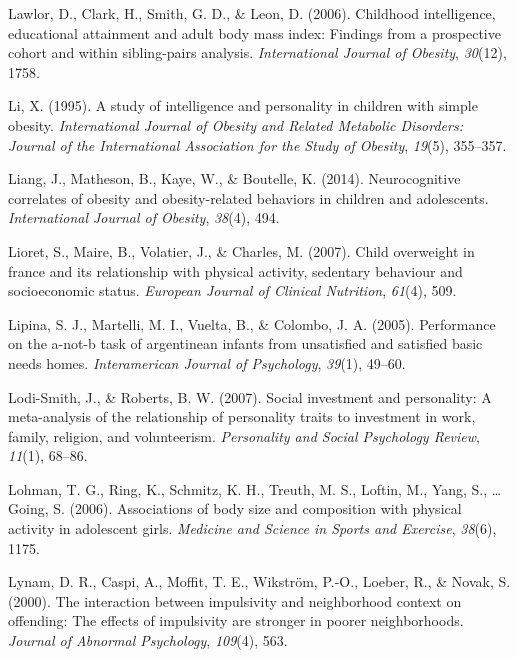 \documentclass[man]{apa6}
\begin{document}
\leavevmode\hypertarget{ref-lawlor2006childhood}{}%
Lawlor, D., Clark, H., Smith, G. D., \& Leon, D. (2006). Childhood intelligence, educational attainment and adult body mass index: Findings from a prospective cohort and within sibling-pairs analysis. \emph{International Journal of Obesity}, \emph{30}(12), 1758.

\leavevmode\hypertarget{ref-li1995study}{}%
Li, X. (1995). A study of intelligence and personality in children with simple obesity. \emph{International Journal of Obesity and Related Metabolic Disorders: Journal of the International Association for the Study of Obesity}, \emph{19}(5), 355--357.

\leavevmode\hypertarget{ref-liang2014neurocognitive}{}%
Liang, J., Matheson, B., Kaye, W., \& Boutelle, K. (2014). Neurocognitive correlates of obesity and obesity-related behaviors in children and adolescents. \emph{International Journal of Obesity}, \emph{38}(4), 494.

\leavevmode\hypertarget{ref-lioret2007child}{}%
Lioret, S., Maire, B., Volatier, J., \& Charles, M. (2007). Child overweight in france and its relationship with physical activity, sedentary behaviour and socioeconomic status. \emph{European Journal of Clinical Nutrition}, \emph{61}(4), 509.

\leavevmode\hypertarget{ref-lipina2005performance}{}%
Lipina, S. J., Martelli, M. I., Vuelta, B., \& Colombo, J. A. (2005). Performance on the a-not-b task of argentinean infants from unsatisfied and satisfied basic needs homes. \emph{Interamerican Journal of Psychology}, \emph{39}(1), 49--60.

\leavevmode\hypertarget{ref-lodi2007social}{}%
Lodi-Smith, J., \& Roberts, B. W. (2007). Social investment and personality: A meta-analysis of the relationship of personality traits to investment in work, family, religion, and volunteerism. \emph{Personality and Social Psychology Review}, \emph{11}(1), 68--86.

\leavevmode\hypertarget{ref-lohman2006associations}{}%
Lohman, T. G., Ring, K., Schmitz, K. H., Treuth, M. S., Loftin, M., Yang, S., \ldots{} Going, S. (2006). Associations of body size and composition with physical activity in adolescent girls. \emph{Medicine and Science in Sports and Exercise}, \emph{38}(6), 1175.

\leavevmode\hypertarget{ref-lynam2000interaction}{}%
Lynam, D. R., Caspi, A., Moffit, T. E., Wikström, P.-O., Loeber, R., \& Novak, S. (2000). The interaction between impulsivity and neighborhood context on offending: The effects of impulsivity are stronger in poorer neighborhoods. \emph{Journal of Abnormal Psychology}, \emph{109}(4), 563.
\end{document}
